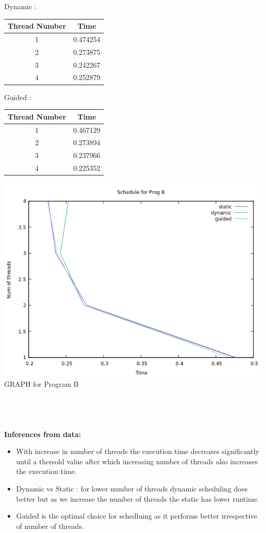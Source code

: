 \documentclass[a4paper,10pt]{article}
\begin{document}
Dynamic :
\begin{center}
\begin{tabular}{ |c|c| } 
 \hline
Thread Number & Time \\ 
 \hline 
1 & 0.474254 \\
2 & 0.273875 \\
3 & 0.242267 \\
4 & 0.252879 \\
 \hline
\end{tabular}
\end{center}
\hspace*{5mm}Guided :
\begin{center}
\begin{tabular}{ |c|c| } 
 \hline
Thread Number & Time \\ 
 \hline 
1 & 0.467129 \\
2 & 0.273894 \\
3 & 0.237966 \\
4 & 0.225352 \\
 \hline
\end{tabular}
\end{center}
\includegraphics[scale=0.7]{progB}\\
GRAPH for Program B\\
\\
\\
\\
\\
\textbf{Inferences from data:}\\
\begin{itemize}
 \item With increase in number of threads the execution time decreases significantly until a thersold value after which increasing number of threads also increases the execution time.
 
 \item Dynamic vs Static :  for lower number of threads dynamic scheduling does better but as we increase the number of threads the static has lower runtime.
 
 \item Guided is the optimal choice for schedluing as it performs better irrespective of number of threads. 
\end{itemize}
\end{document}
